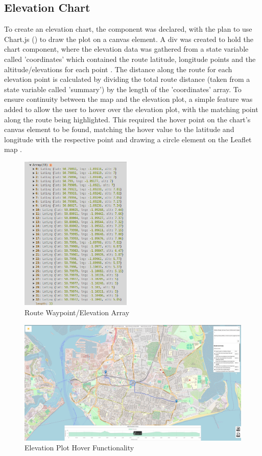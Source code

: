 \subsection{Elevation Chart}
\label{iteration1:elevation-chart}
To create an elevation chart, the component was declared, with the plan to use Chart.js (\cite{noauthor_chartjs_nodate}) to draw the plot on a canvas element. A div was created to hold the chart component, where the elevation data was gathered from a state variable called 'coordinates' which contained the route latitude, longitude points and the altitude/elevations for each point . The distance along the route for each elevation point is calculated by dividing the total route distance (taken from a state variable called 'summary') by the length of the 'coordinates' array. To ensure continuity between the map and the elevation plot, a simple feature was added to allow the user to hover over the elevation plot, with the matching point along the route being highlighted. This required the hover point on the chart's canvas element to be found, matching the hover value to the latitude and longitude with the respective point and drawing a circle element on the Leaflet map .

\begin{figure}[!ht]
    \centering
    \includegraphics[width=200px]{figures/Progress Images/Iteration-1/SR1/waypoint-arr.png}
    \caption{Route Waypoint/Elevation Array}
    \label{fig:waypoint-arr}
  \end{figure}

\begin{figure}[!ht]
    \centering
    \includegraphics[width=425px]{figures/Progress Images/Iteration-1/SR28/elevation-hover.png}
    \caption{Elevation Plot Hover Functionality}
    \label{fig:elevation-hover}
\end{figure}

